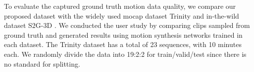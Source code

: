 \documentclass[runningheads]{llncs}
\begin{document}
To evaluate the captured ground truth motion data quality, we compare our proposed dataset with the widely used mocap dataset Trinity \cite{ferstl2018investigating} and in-the-wild dataset S2G-3D \cite{ginosar2019learning,habibie2021learning}. We conducted the user study by comparing clips sampled from ground truth and generated results using motion synthesis networks trained in each dataset. The Trinity dataset has a total of 23 sequences, with 10 minutes each. We randomly divide the data into 19:2:2 for train/valid/test since there is no standard for splitting.


\begin{table}
\vspace{-0.5cm}
\centering
\caption{\textbf{User Study Comparison with Trinity for Data Quality.} Comparing with Trinity \cite{ferstl2018investigating}, BEAT get \colorbox[rgb]{0.574,0.813,0.687}{higher} user preference score in terms of ground truth data quality. ``-b" and ``-h" indicate body and hands, respectively.}
\label{tab:tab2}
\end{table}
\end{document}
